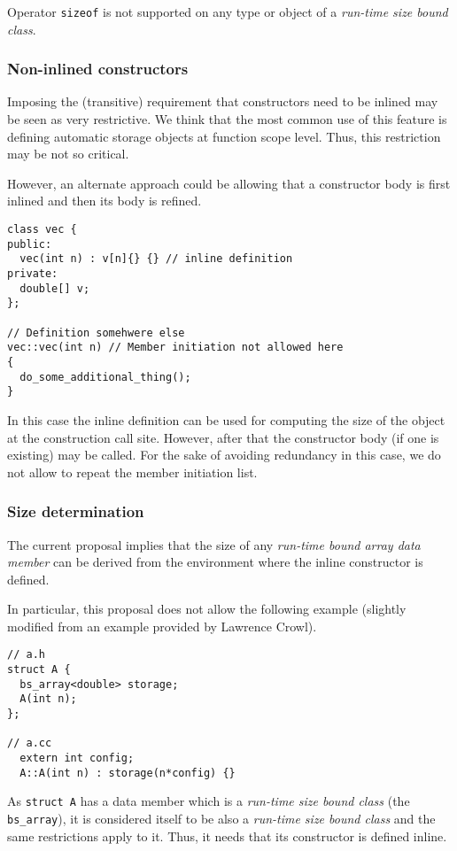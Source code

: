 Operator \verb+sizeof+ is not supported on any type or object of a \emph{run-time size bound class}.

\subsubsection{Non-inlined constructors}

Imposing the (transitive) requirement that constructors need to be inlined may
be seen as very restrictive. We think that the most common use of this feature
is defining automatic storage objects at function scope level. Thus, this
restriction may be not so critical.

However, an alternate approach could be allowing that a constructor body is
first inlined and then its body is refined.

\begin{lstlisting}
class vec {
public:
  vec(int n) : v[n]{} {} // inline definition
private:
  double[] v;
};

// Definition somehwere else
vec::vec(int n) // Member initiation not allowed here
{
  do_some_additional_thing();
}
\end{lstlisting}

In this case the inline definition can be used for computing the size of the
object at the construction call site. However, after that the constructor body
(if one is existing) may be called. For the sake of avoiding redundancy in this
case, we do not allow to repeat the member initiation list.

\subsubsection{Size determination}
\label{sec:inline-size-det}

The current proposal implies that the size of any \emph{run-time bound array
data member} can be derived from the environment where the inline constructor is
defined.

In particular, this proposal does not allow the following example (slightly
modified from an example provided by Lawrence Crowl).

\begin{lstlisting}
// a.h
struct A {
  bs_array<double> storage;
  A(int n);
};

// a.cc
  extern int config;
  A::A(int n) : storage(n*config) {}
\end{lstlisting}

As \verb+struct A+ has a data member which is a \emph{run-time size bound class}
(the \verb+bs_array+), it is considered itself to be also a \emph{run-time size
bound class} and the same restrictions apply to it. Thus, it needs that its
constructor is defined inline.

